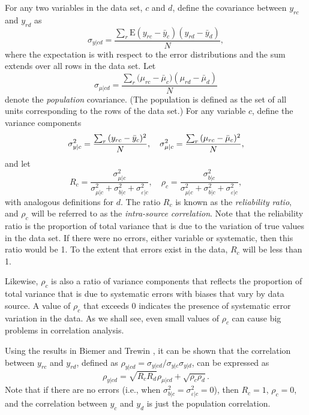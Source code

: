 \documentclass[]{krantz}
\begin{document}
For any two variables in the data set, \(c\) and \(d\), define the
covariance between \(y_{rc}\) and \(y_{rd}\) as \[\label{eq:10-1.6}
\sigma_{y\vert cd} = \frac{\sum\nolimits_r {\mbox{E}(y_{rc} -
\bar{y}_c )(y_{rd} - \bar {y}_d )} }{N},\] where the expectation is with
respect to the error distributions and the sum extends over all rows in
the data set. Let
\[\sigma_{\mu \vert cd} = \frac{\sum\nolimits_r {(\mu_{rc} - \bar{\mu
}_c } )(\mu_{rd} - \bar{\mu }_d )}{N}\] denote the \emph{population}
covariance. (The population is defined as the set of all units
corresponding to the rows of the data set.) For any variable \(c\),
define the variance components
\[\sigma_{y\vert c}^2 = \frac{\sum_r {(y_{rc} -
\bar{y}_c )^2}}{N},\quad \sigma_{\mu \vert c}^2 =\frac{%
\sum_r {(\mu_{rc} - \bar {\mu }_c } )^2}{N},\] and let \[R_c
= \frac{\sigma_{\mu \vert c}^2}{\sigma_{\mu \vert c}^2 +
\sigma_{b\vert c}^2 + \sigma_{\varepsilon \vert c}^2},\quad
\rho_c = \frac{\sigma_{b\vert c}^2}{\sigma_{\mu \vert c}^2 +
\sigma_{b\vert c}^2 + \sigma _{\varepsilon \vert c}^2},\] with analogous
definitions for \(d\). The ratio \(R_{c}\) is known as the
\emph{reliability ratio}, and \(\rho_c\) will be referred to as the
\emph{intra-source correlation}. Note that the reliability ratio is the
proportion of total variance that is due to the variation of true values
in the data set. If there were no errors, either variable or systematic,
then this ratio would be 1. To the extent that errors exist in the data,
\(R_{c}\) will be less than 1.

Likewise, \(\rho_c\) is also a ratio of variance components that
reflects the proportion of total variance that is due to systematic
errors with biases that vary by data source. A value of \(\rho_c\) that
exceeds 0 indicates the presence of systematic error variation in the
data. As we shall see, even small values of \(\rho_c\) can cause big
problems in correlation analysis.

Using the results in Biemer and Trewin \citeyearpar{biemer1997review},
it can be shown that the correlation between \(y_{rc}\) and \(y_{rd}\),
defined as
\(\rho_{y\vert cd} = \sigma_{y\vert cd} / \sigma_{y\vert c} \sigma_{y\vert d}\),
can be expressed as
\[\label{eq:10-1.7} \rho_{y\vert cd} = \sqrt {R_c R_d } \rho_{\mu \vert cd} + \sqrt {\rho_c \rho_d }.\]
Note that if there are no errors (i.e., when
\(\sigma_{b\vert c}^2 = \sigma_{\varepsilon \vert c}^2 = 0\)), then
\(R_c = 1\), \(\rho_c =0\), and the correlation between \(y_{c}\) and
\(y_{d}\) is just the population correlation.
\end{document}
